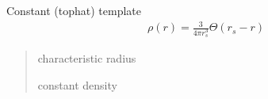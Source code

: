 \documentclass[letterpaper,10pt,english]{sphinxmanual}
\begin{document}
\begin{fulllineitems}
\label{\detokenize{diffsph.profiles:diffsph.profiles.templates.const}}
\pysigstartsignatures
{}
\pysigstopsignatures
\sphinxAtStartPar
Constant (top\sphinxhyphen{}hat) template
\begin{equation*}
\begin{split}\rho(r) = \frac3{4\pi r_s^3}\Theta(r_s-r)\end{split}
\end{equation*}\begin{quote}\begin{description}
\sphinxAtStartPar
{} \textendash{} characteristic radius

\sphinxAtStartPar
constant density

\end{description}\end{quote}

\end{fulllineitems}

\end{document}
